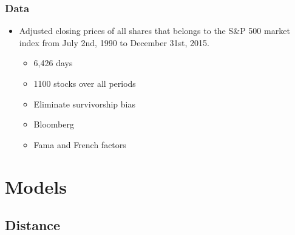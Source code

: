 \documentclass[pdf,9pt,xcolor=dvipsnames,hide notes]{beamer}
\begin{document}
\begin{frame}[label=frame2b]
	\frametitle{Data}
		\begin{itemize}
		\setlength\itemsep{1em}
		\justifying
		
		\item 	Adjusted closing prices of all shares that belongs to the S\&P 500 market index from July 2nd, 1990 to December 31st, 2015. 
		\begin{itemize}
			\setlength\itemsep{1em}
			\item 6,426 days
			\item 1100 stocks over all periods
			\item Eliminate survivorship bias 
			\item Bloomberg
			\item Fama and French factors 
		\end{itemize}
	\end{itemize}

		
	
\end{frame}

	\section{Models}
\subsection{Distance}
\end{document}
